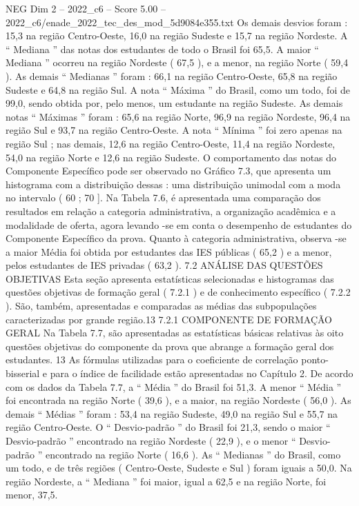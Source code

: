 \begin{textsample}{NEG Dim 2 – 2022\_c6 – Score 5.00 – 2022\_c6/enade\_2022\_tec\_des\_mod\_5d9084e355.txt}
Os demais desvios foram : 15,3 na região Centro-Oeste, 16,0 na região Sudeste e 15,7 na região Nordeste.
A “ Mediana ” das notas dos estudantes de todo o Brasil foi 65,5.
A maior “ Mediana ” ocorreu na região Nordeste ( 67,5 ), e a menor, na região Norte ( 59,4 ).
As demais “ Medianas ” foram : 66,1 na região Centro-Oeste, 65,8 na região Sudeste e 64,8 na região Sul.
A nota “ Máxima ” do Brasil, como um todo, foi de 99,0, sendo obtida por, pelo menos, um estudante na região Sudeste.
As demais notas “ Máximas ” foram : 65,6 na região Norte, 96,9 na região Nordeste, 96,4 na região Sul e 93,7 na região Centro-Oeste.
A nota “ Mínima ” foi zero apenas na região Sul ; nas demais, 12,6 na região Centro-Oeste, 11,4 na região Nordeste, 54,0 na região Norte e 12,6 na região Sudeste.
O comportamento das notas do Componente Específico pode ser observado no Gráfico 7.3, que apresenta um histograma com a distribuição dessas : uma distribuição unimodal com a moda no intervalo ( 60 ; 70 ].
Na Tabela 7.6, é apresentada uma comparação dos resultados em relação a categoria administrativa, a organização acadêmica e a modalidade de oferta, agora levando -se em conta o desempenho de estudantes do Componente Específico da prova.
Quanto à categoria administrativa, observa -se a maior Média foi obtida por estudantes das IES públicas ( 65,2 ) e a menor, pelos estudantes de IES privadas ( 63,2 ). 7.2 ANÁLISE DAS QUESTÕES OBJETIVAS Esta seção apresenta estatísticas selecionadas e histogramas das questões objetivas de formação geral ( 7.2.1 ) e de conhecimento específico ( 7.2.2 ).
São, também, apresentadas e comparadas as médias das subpopulações caracterizadas por grande região.13 7.2.1 COMPONENTE DE FORMAÇÃO GERAL Na Tabela 7.7, são apresentadas as estatísticas básicas relativas às oito questões objetivas do componente da prova que abrange a formação geral dos estudantes. 13 As fórmulas utilizadas para o coeficiente de correlação ponto-bisserial e para o índice de facilidade estão apresentadas no Capítulo 2.
De acordo com os dados da Tabela 7.7, a “ Média ” do Brasil foi 51,3.
A menor “ Média ” foi encontrada na região Norte ( 39,6 ), e a maior, na região Nordeste ( 56,0 ).
As demais “ Médias ” foram : 53,4 na região Sudeste, 49,0 na região Sul e 55,7 na região Centro-Oeste.
O “ Desvio-padrão ” do Brasil foi 21,3, sendo o maior “ Desvio-padrão ” encontrado na região Nordeste ( 22,9 ), e o menor “ Desvio-padrão ” encontrado na região Norte ( 16,6 ).
As “ Medianas ” do Brasil, como um todo, e de três regiões ( Centro-Oeste, Sudeste e Sul ) foram iguais a 50,0.
Na região Nordeste, a “ Mediana ” foi maior, igual a 62,5 e na região Norte, foi menor, 37,5.

\end{textsample}
